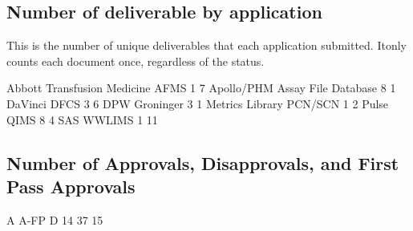 \documentclass{article}
\begin{document}
\subsection{Number of deliverable by application}
This is the number of unique deliverables that each application submitted. Itonly counts
each document once, regardless of the status.
\begin{Schunk}
\begin{Soutput}
Abbott Transfusion Medicine                        AFMS 
                          1                           7 
                 Apollo/PHM        Assay File Database  
                          8                           1 
                    DaVinci                        DFCS 
                          3                           6 
                        DPW                   Groninger 
                          3                           1 
            Metrics Library                     PCN/SCN 
                          1                           2 
                      Pulse                        QIMS 
                          8                           4 
                        SAS                      WWLIMS 
                          1                          11 
\end{Soutput}
\end{Schunk}

\subsection{Number of Approvals, Disapprovals, and First Pass Approvals}

\begin{Schunk}
\begin{Soutput}
   A A-FP    D 
  14   37   15 
\end{Soutput}
\end{Schunk}
\end{document}

